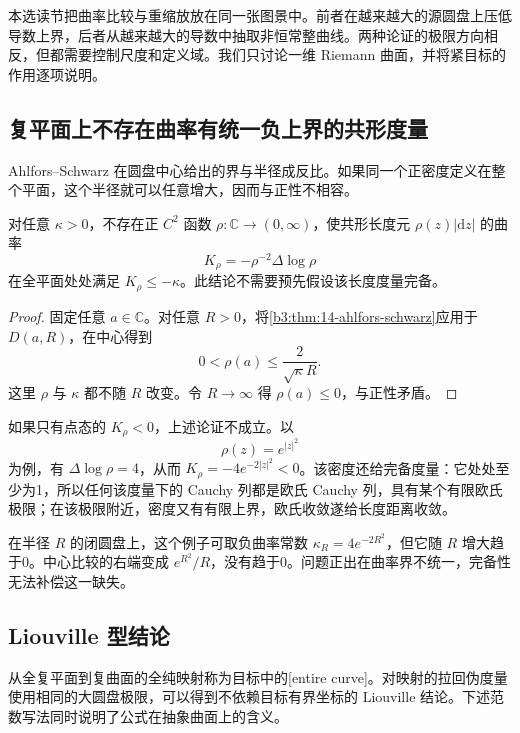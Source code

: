 
本选读节把曲率比较与重缩放放在同一张图景中。前者在越来越大的源圆盘上压低导数上界，后者从越来越大的导数中抽取非恒常整曲线。两种论证的极限方向相反，但都需要控制尺度和定义域。我们只讨论一维 Riemann 曲面，并将紧目标的作用逐项说明。

\subsection{复平面上不存在曲率有统一负上界的共形度量}
\label{b3:subsec:140601}

Ahlfors--Schwarz 在圆盘中心给出的界与半径成反比。如果同一个正密度定义在整个平面，这个半径就可以任意增大，因而与正性不相容。

\begin{corollary}\label{b3:cor:14-no-uniform-negative-plane}
对任意 \(\kappa>0\)，不存在正 \(C^2\) 函数 \(\rho:\mathbb C\to(0,\infty)\)，使共形长度元 \(\rho(z)|\mathrm dz|\) 的曲率
\[
 K_\rho=-\rho^{-2}\Delta\log\rho
\]
在全平面处处满足 \(K_\rho\le-\kappa\)。此结论不需要预先假设该长度度量完备。
\end{corollary}
\begin{proof}
固定任意 \(a\in\mathbb C\)。对任意 \(R>0\)，将\cref{b3:thm:14-ahlfors-schwarz}应用于 \(D(a,R)\)，在中心得到
\[
 0<\rho(a)\le\frac{2}{\sqrt\kappa R}.
\]
这里 \(\rho\) 与 \(\kappa\) 都不随 \(R\) 改变。令 \(R\to\infty\) 得 \(\rho(a)\le0\)，与正性矛盾。
\end{proof}
如果只有点态的 \(K_\rho<0\)，上述论证不成立。以
\[
 \rho(z)=e^{|z|^2}
\]
为例，有 \(\Delta\log\rho=4\)，从而 \(K_\rho=-4e^{-2|z|^2}<0\)。该密度还给完备度量：它处处至少为1，所以任何该度量下的 Cauchy 列都是欧氏 Cauchy 列，具有某个有限欧氏极限；在该极限附近，密度又有有限上界，欧氏收敛遂给长度距离收敛。

\ProseParagraphBreak
在半径 \(R\) 的闭圆盘上，这个例子可取负曲率常数 \(\kappa_R=4e^{-2R^2}\)，但它随 \(R\) 增大趋于0。中心比较的右端变成 \(e^{R^2}/R\)，没有趋于0。问题正出在曲率界不统一，完备性无法补偿这一缺失。

\subsection{Liouville 型结论}
\label{b3:subsec:140602}

从全复平面到复曲面的全纯映射称为目标中的[entire curve]。对映射的拉回伪度量使用相同的大圆盘极限，可以得到不依赖目标有界坐标的 Liouville 结论。下述范数写法同时说明了公式在抽象曲面上的含义。

